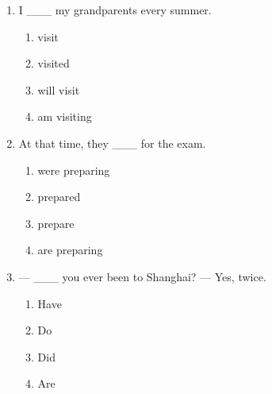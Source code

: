 \documentclass[11pt,a4paper]{ctexart}
\begin{document}
\begin{enumerate}[leftmargin=*,itemsep=4pt]
\begin{enumerate}[label=\Alph*.,leftmargin=2em,itemsep=1pt,topsep=2pt]
\item is losing
\end{enumerate}
\item I \_\_\_ my grandparents every summer.
\begin{enumerate}[label=\Alph*.,leftmargin=2em,itemsep=1pt,topsep=2pt]
\item visit
\item visited
\item will visit
\item am visiting
\end{enumerate}
\item At that time, they \_\_\_ for the exam.
\begin{enumerate}[label=\Alph*.,leftmargin=2em,itemsep=1pt,topsep=2pt]
\item were preparing
\item prepared
\item prepare
\item are preparing
\end{enumerate}
\item — \_\_\_ you ever been to Shanghai? — Yes, twice.
\begin{enumerate}[label=\Alph*.,leftmargin=2em,itemsep=1pt,topsep=2pt]
\item Have
\item Do
\item Did
\item Are
\end{enumerate}
\end{enumerate}

\newpage
\end{document}
